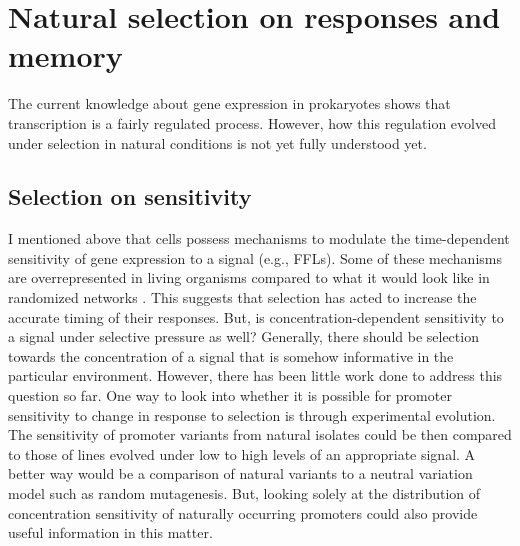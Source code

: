 \section{Natural selection on responses and memory}
The current knowledge about gene expression in prokaryotes shows that transcription is a fairly regulated process.
However, how this regulation evolved under selection in natural conditions is not yet fully understood yet.

\subsection{Selection on sensitivity}
I mentioned above that cells possess mechanisms to modulate the time-dependent sensitivity of gene expression to a signal (e.g., FFLs).
Some of these mechanisms are overrepresented in living organisms compared to what it would look like in randomized networks \cite{shen2002network, mangan2003structure}.
This suggests that selection has acted to increase the accurate timing of their responses.
But, is concentration-dependent sensitivity to a signal under selective pressure as well?
Generally, there should be selection towards the concentration of a signal that is somehow informative in the particular environment.
However, there has been little work done to address this question so far.
One way to look into whether it is possible for promoter sensitivity to change in response to selection is through experimental evolution.
The sensitivity of promoter variants from natural isolates could be then compared to those of lines evolved under low to high levels of an appropriate signal.
A better way would be a comparison of natural variants to a neutral variation model such as random mutagenesis.
But, looking solely at the distribution of concentration sensitivity of naturally occurring promoters could also provide useful information in this matter.

